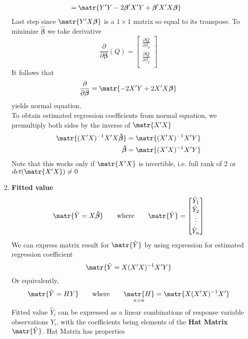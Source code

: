 \documentclass[11pt]{article}
\begin{document}
\begin{enumerate}
\begin{align*}
        &= \matr{Y'Y - 2\boldsymbol{\beta}' X' Y + \boldsymbol{\beta}' X' X \boldsymbol{\beta}}
    \end{align*}
    Last step since $\matr{Y'X\boldsymbol{\beta}}$ is a $1\times 1$ matrix so equal to its transpose. To minimize $\boldsymbol{\hat{\beta}}$ we take derivative 
    \[
        \frac{\partial}{\partial \boldsymbol{\beta}} (Q) = 
        \begin{bmatrix}
            \frac{\partial Q}{\partial \beta_0} \\
            \frac{\partial Q}{\partial \beta_1} \\ 
        \end{bmatrix}
    \]
    It follows that 
    \[
        \frac{\partial}{\partial \boldsymbol{\beta}} = 
        \matr{ -2X'Y + 2X'X\boldsymbol{\beta}}
    \]
    yields normal equation.\\
    To obtain estimated regression coefficients from normal equation, we premultiply both sides by the inverse of $\matr{X' X}$ 
    \begin{align*}
        \matr{(X'X)^{-1} X'X \boldsymbol{\hat{\beta}}} &= \matr{(X'X)^{-1}X'Y} \\
        \boldsymbol{\hat{\beta}} &= \matr{(X'X)^{-1}X'Y} \\
    \end{align*}
    Note that this works only if $\matr{X'X}$ is invertible, i.e. full rank of 2 or $det(\matr{X'X}) \neq 0$
    \item \textbf{Fitted value} \\
    \[
        \matr{\hat{Y} = X \boldsymbol{\hat{\beta}}} 
        \quad \quad \text{where} \quad \quad 
        \matr{\hat{Y}} = 
        \begin{bmatrix}
            \hat{Y}_1 \\ \hat{Y}_2 \\ \vdots \\ \hat{Y}_n \\ 
        \end{bmatrix}
    \]
    We can express matrix result for $\matr{\hat{Y}}$ by using expression for estimated regression coefficient 
    \[
        \matr{\hat{Y} = X(X'X)^{-1}X'Y}
    \]
    Or equivalently,
    \[
        \matr{\hat{Y} = HY} 
        \quad \quad \text{where}\quad \quad 
        \underset{n\times n}{\matr{H}} = \matr{X(X'X)^{-1}X'}
    \]
    Fitted value $\hat{Y}_i$ can be expressed as a linear combinations of response variable observations $Y_i$, with the coefficients being elements of the \textbf{Hat Matrix} $\matr{\hat{Y}}$. Hat Matrix has properties 

\end{enumerate}
\end{document}
